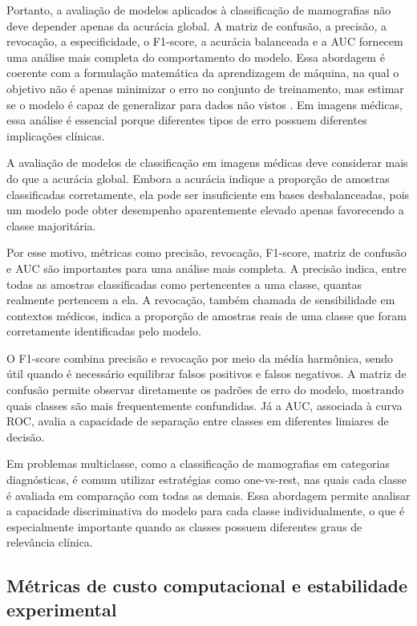\documentclass[
    12pt,
    openright,
    oneside,
    a4paper,
    english,
    brazil
]{abntex2}
\begin{document}
Portanto, a avaliação de modelos aplicados à classificação de mamografias não deve depender apenas da acurácia global. A matriz de confusão, a precisão, a revocação, a especificidade, o F1-score, a acurácia balanceada e a AUC fornecem uma análise mais completa do comportamento do modelo. Essa abordagem é coerente com a formulação matemática da aprendizagem de máquina, na qual o objetivo não é apenas minimizar o erro no conjunto de treinamento, mas estimar se o modelo é capaz de generalizar para dados não vistos \cite{deisenroth2020mathematics}. Em imagens médicas, essa análise é essencial porque diferentes tipos de erro possuem diferentes implicações clínicas.


A avaliação de modelos de classificação em imagens médicas deve considerar mais do que a acurácia global. Embora a acurácia indique a proporção de amostras classificadas corretamente, ela pode ser insuficiente em bases desbalanceadas, pois um modelo pode obter desempenho aparentemente elevado apenas favorecendo a classe majoritária.

Por esse motivo, métricas como precisão, revocação, F1-score, matriz de confusão e AUC são importantes para uma análise mais completa. A precisão indica, entre todas as amostras classificadas como pertencentes a uma classe, quantas realmente pertencem a ela. A revocação, também chamada de sensibilidade em contextos médicos, indica a proporção de amostras reais de uma classe que foram corretamente identificadas pelo modelo.

O F1-score combina precisão e revocação por meio da média harmônica, sendo útil quando é necessário equilibrar falsos positivos e falsos negativos. A matriz de confusão permite observar diretamente os padrões de erro do modelo, mostrando quais classes são mais frequentemente confundidas. Já a AUC, associada à curva ROC, avalia a capacidade de separação entre classes em diferentes limiares de decisão.

Em problemas multiclasse, como a classificação de mamografias em categorias diagnósticas, é comum utilizar estratégias como one-vs-rest, nas quais cada classe é avaliada em comparação com todas as demais. Essa abordagem permite analisar a capacidade discriminativa do modelo para cada classe individualmente, o que é especialmente importante quando as classes possuem diferentes graus de relevância clínica.

\subsection{Métricas de custo computacional e estabilidade experimental}
\label{subsec:metricas_custo_estabilidade}
\end{document}
